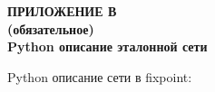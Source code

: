 \clearpage
{}%
\par

\normalsize
\begin{center}
  \textbf{ПРИЛОЖЕНИЕ В} \\
  \textbf{(обязательное)} \\
  \textbf{Python описание эталонной сети}
\end{center}

Python описание сети в fixpoint:



\pdfpagewidth=210mm
\pdfpageheight=297mm